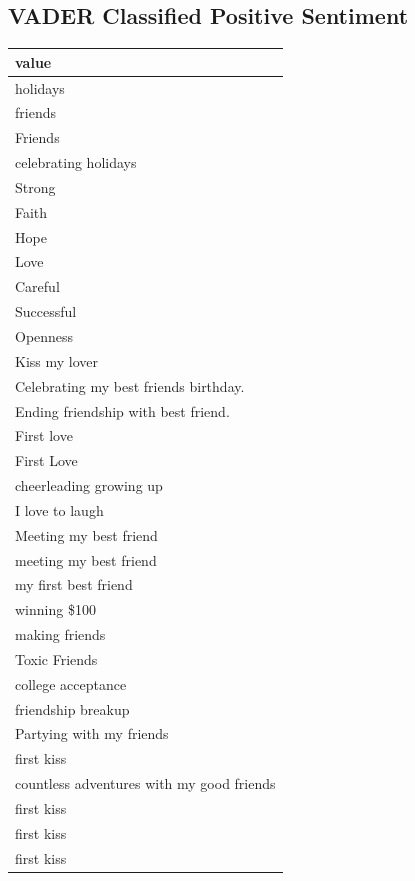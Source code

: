 \documentclass[
  .7em,
  letterpaper,
  DIV=11,
  numbers=noendperiod]{scrartcl}
\begin{document}
\hypertarget{vader-classified-positive-sentiment}{%
\subsection{VADER Classified Positive
Sentiment}\label{vader-classified-positive-sentiment}}

\begin{table}
\centering
\begin{tabular}{l}
\hline
value\\
\hline
holidays\\
\hline
friends\\
\hline
Friends\\
\hline
celebrating holidays\\
\hline
Strong\\
\hline
Faith\\
\hline
Hope\\
\hline
Love\\
\hline
Careful\\
\hline
Successful\\
\hline
Openness\\
\hline
Kiss my lover\\
\hline
Celebrating my best friends birthday.\\
\hline
Ending friendship with best friend.\\
\hline
First love\\
\hline
First Love\\
\hline
cheerleading growing up\\
\hline
I love to laugh\\
\hline
Meeting my best friend\\
\hline
meeting my best friend\\
\hline
my first best friend\\
\hline
winning \$100\\
\hline
making friends\\
\hline
Toxic Friends\\
\hline
college acceptance\\
\hline
friendship breakup\\
\hline
Partying with my friends\\
\hline
first kiss\\
\hline
countless adventures with my good friends\\
\hline
first kiss\\
\hline
first kiss\\
\hline
first kiss\\
\hline

\end{tabular}
\end{table}
\end{document}
